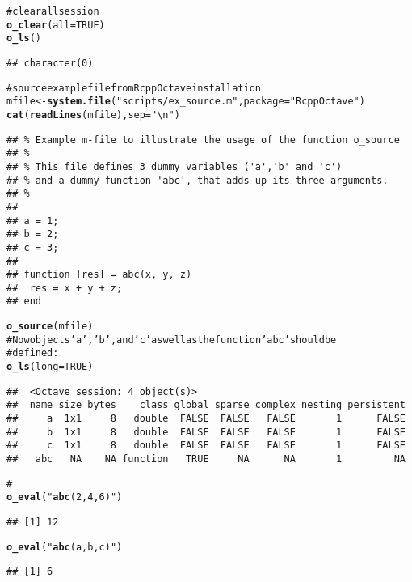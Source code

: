 \documentclass[english,10pt,a4paper]{article}\usepackage{graphicx, color}
\makeatletter
\newcommand{\hlfunctioncall}[1]{\textcolor[rgb]{0.501960784313725,0,0.329411764705882}{\textbf{#1}}}%
\newcommand{\hlstring}[1]{\textcolor[rgb]{0.6,0.6,1}{#1}}%
\newcommand{\hlcomment}[1]{\textcolor[rgb]{0.180392156862745,0.6,0.341176470588235}{#1}}%
\newenvironment{kframe}{%
 \def\at@end@of@kframe{}%
 \ifinner\ifhmode%
  \def\at@end@of@kframe{\end{minipage}}%
  \begin{minipage}{\columnwidth}%
 \fi\fi%
 \def\FrameCommand##1{\hskip\@totalleftmargin \hskip-\fboxsep
 \colorbox{shadecolor}{##1}\hskip-\fboxsep
     \hskip-\linewidth \hskip-\@totalleftmargin \hskip\columnwidth}%
 \MakeFramed {\advance\hsize-\width
   \@totalleftmargin\z@ \linewidth\hsize
   \@setminipage}}%
 {\par\unskip\endMakeFramed%
 \at@end@of@kframe}
\newenvironment{knitrout}{}{} %
\makeatother
\begin{document}
\begin{knitrout}
\color{fgcolor}\begin{kframe}
\begin{alltt}
\hlcomment{# clear all session}
\hlfunctioncall{o_clear}(all = TRUE)
\hlfunctioncall{o_ls}()
\end{alltt}
\begin{verbatim}
## character(0)
\end{verbatim}
\begin{alltt}

\hlcomment{# source example file from RcppOctave installation}
mfile <- \hlfunctioncall{system.file}(\hlstring{"scripts/ex_source.m"}, package = \hlstring{"RcppOctave"})
\hlfunctioncall{cat}(\hlfunctioncall{readLines}(mfile), sep = \hlstring{"\textbackslash{}n"})
\end{alltt}
\begin{verbatim}
## % Example m-file to illustrate the usage of the function o_source
## %
## % This file defines 3 dummy variables ('a','b' and 'c') 
## % and a dummy function 'abc', that adds up its three arguments.
## % 
## 
## a = 1;
## b = 2;
## c = 3;
## 
## function [res] = abc(x, y, z)
## 	res = x + y + z; 
## end
\end{verbatim}
\begin{alltt}
\hlfunctioncall{o_source}(mfile)
\hlcomment{# Now objects \hlstring{'a'}, \hlstring{'b'}, and \hlstring{'c'} as well as the function \hlstring{'abc'} should be}
\hlcomment{# defined:}
\hlfunctioncall{o_ls}(long = TRUE)
\end{alltt}
\begin{verbatim}
##  <Octave session: 4 object(s)>
##  name size bytes    class global sparse complex nesting persistent
##     a  1x1     8   double  FALSE  FALSE   FALSE       1      FALSE
##     b  1x1     8   double  FALSE  FALSE   FALSE       1      FALSE
##     c  1x1     8   double  FALSE  FALSE   FALSE       1      FALSE
##   abc   NA    NA function   TRUE     NA      NA       1         NA
\end{verbatim}
\begin{alltt}
\hlcomment{#}
\hlfunctioncall{o_eval}(\hlstring{"\hlfunctioncall{abc}(2, 4, 6)"})
\end{alltt}
\begin{verbatim}
## [1] 12
\end{verbatim}
\begin{alltt}
\hlfunctioncall{o_eval}(\hlstring{"\hlfunctioncall{abc}(a, b, c)"})
\end{alltt}
\begin{verbatim}
## [1] 6
\end{verbatim}
\end{kframe}
\end{knitrout}
\end{document}
